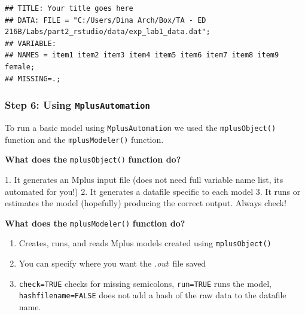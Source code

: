 \documentclass[
]{article}
\providecommand{\tightlist}{%
  \setlength{\itemsep}{0pt}\setlength{\parskip}{0pt}}
\begin{document}
\begin{verbatim}
## TITLE: Your title goes here
## DATA: FILE = "C:/Users/Dina Arch/Box/TA - ED 216B/Labs/part2_rstudio/data/exp_lab1_data.dat";
## VARIABLE: 
## NAMES = item1 item2 item3 item4 item5 item6 item7 item8 item9 female; 
## MISSING=.;
\end{verbatim}

\hypertarget{step-6-using-mplusautomation}{%
\subsubsection{\texorpdfstring{Step 6: Using
\texttt{MplusAutomation}}{Step 6: Using MplusAutomation}}\label{step-6-using-mplusautomation}}

To run a basic model using \texttt{MplusAutomation} we used the
\texttt{mplusObject()} function and the \texttt{mplusModeler()}
function.

\textbf{What does the} \texttt{mplusObject()} \textbf{function do?}

1. It generates an Mplus input file (does not need full variable name
list, its automated for you!) 2. It generates a datafile specific to
each model 3. It runs or estimates the model (hopefully) producing the
correct output. Always check!

\textbf{What does the} \texttt{mplusModeler()} \textbf{function do?}

\begin{enumerate}
\def\labelenumi{\arabic{enumi}.}
\tightlist
\item
  Creates, runs, and reads Mplus models created using
  \texttt{mplusObject()}
\item
  You can specify where you want the \emph{.out}~file saved
\item
  \texttt{check=TRUE} checks for missing semicolons, \texttt{run=TRUE}
  runs the model, \texttt{hashfilename=FALSE} does not add a hash of the
  raw data to the datafile name.
\end{enumerate}
\end{document}
